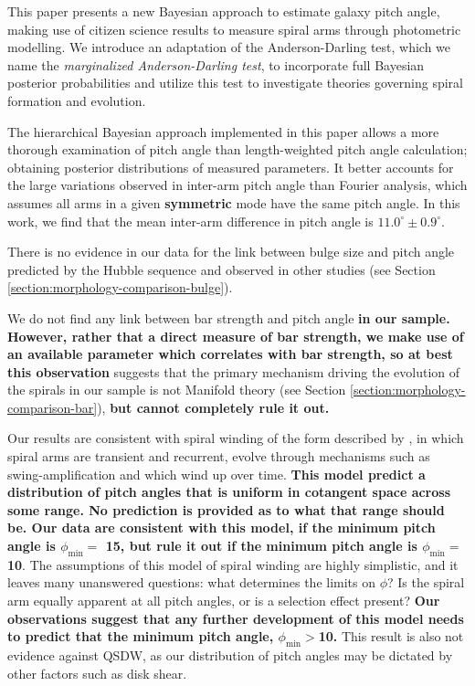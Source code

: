 \label{section:summary}
This paper presents a new Bayesian approach to estimate galaxy pitch angle, making use of citizen science results to measure spiral arms through photometric modelling. We introduce an adaptation of the Anderson-Darling test, which we name the \textit{marginalized Anderson-Darling test}, to incorporate full Bayesian posterior probabilities and utilize this test to investigate theories governing spiral formation and evolution.

The hierarchical Bayesian approach implemented in this paper allows a more thorough examination of pitch angle than length-weighted pitch angle calculation; obtaining posterior distributions of measured parameters. It better accounts for the large variations observed in inter-arm pitch angle than Fourier analysis, which assumes all arms in a given \textbf{symmetric} mode have the same pitch angle. In this work, we find that the mean inter-arm difference in pitch angle is $11.0^\circ\pm 0.9^\circ$.

There is no evidence in our data for the link between bulge size and pitch angle predicted by the Hubble sequence and observed in other studies (see Section \ref{section:morphology-comparison-bulge}).

We do not find any link between bar strength and pitch angle \textbf{in our sample. However, rather that a direct measure of bar strength, we make use of an available parameter which correlates with bar strength, so at best this observation} suggests that the primary mechanism driving the evolution of the spirals in our sample is not Manifold theory (see Section \ref{section:morphology-comparison-bar}), \textbf{but cannot completely rule it out.}

Our results are consistent with spiral winding of the form described by \citet{2019arXiv190910291P}, in which spiral arms are transient and recurrent, evolve through mechanisms such as swing-amplification \citep{1965MNRAS.130..125G} and which wind up over time. \textbf{This model predict a distribution of pitch angles that is uniform in cotangent space across some range. No prediction is provided as to what that range should be. Our data are consistent with this model, if the minimum pitch angle is $\phi_\mathrm{min} = $ {15\degree}, but rule it out if the minimum pitch angle is $\phi_\mathrm{min} = $ {10\degree}}. The assumptions of this model of spiral winding are highly simplistic, and it leaves many unanswered questions: what determines the limits on $\phi$? Is the spiral arm equally apparent at all pitch angles, or is a selection effect present? \textbf{Our observations suggest that any further development of this model needs to predict that the minimum pitch angle, $\phi_\mathrm{min}>${10\degree}.} This result is also not evidence against QSDW, as our distribution of pitch angles may be dictated by other factors such as disk shear.


